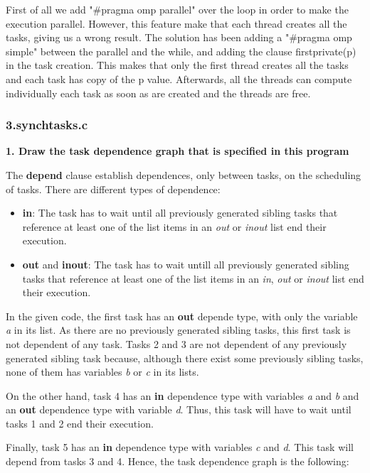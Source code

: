 \documentclass[12pt, a4paper]{article}
\begin{document}
First of all we add "\#pragma omp parallel" over the loop in order to make the execution parallel. However, this feature make that each thread creates all the tasks, giving us a wrong result.
The solution has been adding a "\#pragma omp simple" between the parallel and the while, and adding the clause firstprivate(p) in the task creation.
This makes that only the first thread creates all the tasks and each task has copy of the p value. Afterwards, all the threads can compute individually each task as soon as are created and the threads are free.

\subsubsection{3.synchtasks.c}

\textbf{1. Draw the task dependence graph that is specified in this program}

The \textbf{depend} clause establish dependences, only between tasks, on the scheduling of tasks. There are different types of dependence:

\begin{itemize}
	\item \textbf{in}: The task has to wait until all previously generated sibling tasks that reference at least one of the list items in an \textit{out} or \textit{inout} list end their execution.
	\item \textbf{out} and \textbf{inout}: The task has to wait untill all previously generated sibling tasks that reference at least one of the list items in an \textit{in}, \textit{out} or \textit{inout} list end their execution.
\end{itemize}

In the given code, the first task has an \textbf{out} depende type, with only the variable \textit{a} in its list. As there are no previously generated sibling tasks, this first task is not dependent of any task. Tasks 2 and 3 are not dependent of any previously generated sibling task because, although there exist some previously sibling tasks, none of them has variables \textit{b} or \textit{c} in its lists.

On the other hand, task 4 has an \textbf{in} dependence type with variables \textit{a} and \textit{b} and an \textbf{out} dependence type with variable \textit{d}. Thus, this task will have to wait until tasks 1 and 2 end their execution.

Finally, task 5 has an \textbf{in} dependence type with variables \textit{c} and \textit{d}. This task will depend from tasks 3 and 4. Hence, the task dependence graph is the following:
\end{document}
